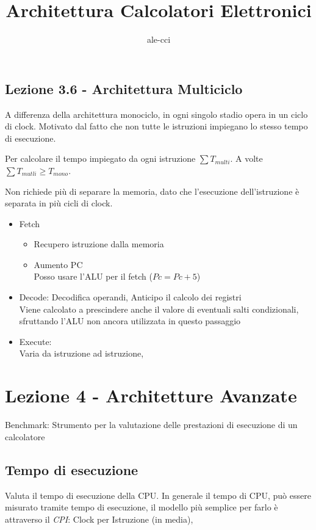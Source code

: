 \documentclass[a4paper,10pt]{article}
\title{Architettura Calcolatori Elettronici}
\author{ale-cci}
\begin{document}
\maketitle{}



\subsection{Lezione 3.6 - Architettura Multiciclo}
A differenza della architettura monociclo, in ogni singolo stadio opera in un ciclo di clock.
Motivato dal fatto che non tutte le istruzioni impiegano lo stesso tempo di esecuzione.

Per calcolare il tempo impiegato da ogni istruzione $\sum{T_{multi}}$.
A volte $\sum{T_{mutli}} \ge T_{mono}$.

Non richiede più di separare la memoria, dato che l'esecuzione dell'istruzione è separata in più cicli di clock.

\begin{itemize}
    \item Fetch
        \begin{itemize}
            \item Recupero istruzione dalla memoria
            \item Aumento PC
                \\
                Posso usare l'ALU per il fetch ($Pc = Pc + 5$)
        \end{itemize}
    \item Decode:
        Decodifica operandi, Anticipo il calcolo dei registri
        \\
        Viene calcolato a prescindere anche il valore di eventuali salti condizionali,
        sfruttando l'ALU non ancora utilizzata in questo passaggio

    \item Execute:
        \\
        Varia da istruzione ad istruzione,
\end{itemize}

\section{Lezione 4 - Architetture Avanzate}
Benchmark: Strumento per la valutazione delle prestazioni di esecuzione di un calcolatore

\subsection{Tempo di esecuzione}
Valuta il tempo di esecuzione della CPU.
In generale il tempo di CPU, può essere misurato tramite tempo di esecuzione, il modello più semplice per farlo è attraverso il
\textit{CPI}: Clock per Istruzione (in media),
\end{document}
